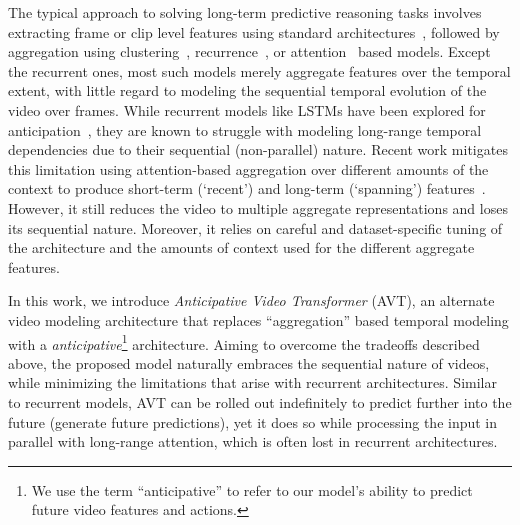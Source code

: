 \documentclass[10pt,twocolumn,letterpaper]{article}
\newcommand{\methodfull}{Anticipative Video Transformer\xspace}
\newcommand{\method}{AVT\xspace}
\newcommand{\lossBoth}{anticipative\xspace}
\begin{document}
The typical approach to solving long-term predictive reasoning tasks involves extracting frame or clip level features using standard architectures~\cite{wang2016tsn,tran2015learning,carreira2017quo}, followed by aggregation using clustering~\cite{Girdhar_17a_ActionVLAD,miech17loupe}, recurrence~\cite{furnari2019rulstm,furnari2020rulstm,Karpathy_14}, or attention~\cite{long2017attention,wu2019long,girdhar2019video,sener2020temporal} based models. Except the recurrent ones, most such models merely aggregate features over the temporal extent, with little regard to modeling the sequential temporal evolution of the video over frames. While recurrent models like LSTMs have been explored for anticipation~\cite{furnari2019rulstm,abu2018will,wu2021imaginernn}, they are known to struggle with modeling long-range temporal dependencies due to their sequential (non-parallel) nature.   
Recent work mitigates this limitation using attention-based aggregation over different amounts of the context to produce short-term (`recent') and long-term (`spanning') features~\cite{sener2020temporal}. However, it still reduces the video to multiple aggregate representations and loses its sequential nature. Moreover, it relies on careful and dataset-specific tuning of the architecture and the amounts of context used for the different aggregate features.

In this work, we introduce \emph{\methodfull} (\method), an alternate video modeling architecture that replaces ``aggregation'' based temporal modeling with a 
{\em \lossBoth{}}\footnote{We use the term ``\lossBoth{}'' to refer to our model's ability to predict future video features and actions.}
architecture.  
Aiming to overcome the tradeoffs described above, the proposed model naturally embraces the sequential nature of videos, while minimizing the limitations that arise with recurrent architectures. 
Similar to recurrent models, \method can be rolled out indefinitely to predict further into the future (\ie generate future predictions), yet it does so while processing the input in parallel with long-range attention, which is often lost in recurrent architectures.
\end{document}
